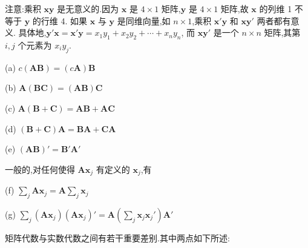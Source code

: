 注意:乘积 $\bm{x}\bm{y}$ 是无意义的.因为 $\bm{x}$ 是 $4\times 1$ 矩阵,$\bm{y}$ 是 $4\times 1$ 矩阵,故 $\bm{x}$ 的列维 1 不等于 $\bm{y}$ 的行维 4. 如果 $\bm{x}$ 与 $\bm{y}$ 是同维向量,如 $n\times 1$,乘积 $\bm{x}'\bm{y}$ 和 $\bm{x}\bm{y}'$ 两者都有意义. 具体地,$\bm{y}'\bm{x} = \bm{x}'\bm{y} = x_1y_1 + x_2y_2 + \cdots + x_ny_n$, 而 $\bm{x}\bm{y}'$ 是一个 $n\times n$ 矩阵,其第 $i,j$ 个元素为 $x_iy_j$.


(a) $c(\bm{A}\bm{B}) = (c\bm{A})\bm{B}$

(b) $\bm{A}(\bm{B}\bm{C}) = (\bm{A}\bm{B})\bm{C}$

(c) $\bm{A}(\bm{B}+\bm{C}) = \bm{A}\bm{B} + \bm{A}\bm{C}$

(d) $(\bm{B}+\bm{C})\bm{A} = \bm{B}\bm{A} + \bm{C}\bm{A}$

(e) $(\bm{A}\bm{B})' = \bm{B}'\bm{A}'$

一般的,对任何使得 $\bm{A}\bm{x}_j$ 有定义的 $\bm{x}_j$,有

(f) $\displaystyle\sum_{j}\bm{A}\bm{x}_j = \bm{A}\sum_{j}\bm{x}_j$

(g) $\displaystyle\sum_{j}(\bm{A}\bm{x}_j)(\bm{A}\bm{x}_j)' = \bm{A}\left(\sum_{j}\bm{x}_j\bm{x}_j'\right)\bm{A}'$

矩阵代数与实数代数之间有若干重要差别.其中两点如下所述:
